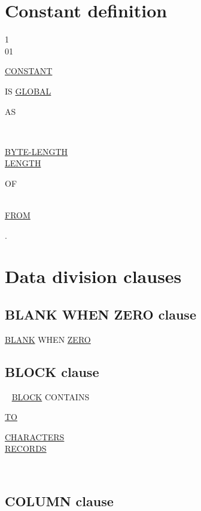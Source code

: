 \documentclass[a4paper,oneside,svgnames]{scrbook}
\makeatletter
\newcommand{\key}[1]{\underline{#1}}
\newcommand{\pending}[1]{%
  \textcolor{gray!75}{#1}}
\newenvironment{0-1}{$\left[ \begin{tabular}{@{}l@{}}}{\end{tabular} \right]$}
\newenvironment{1=}{$\left\{ \begin{tabular}{@{}l@{}}}{\end{tabular} \right\}$}
\makeatother
\begin{document}
\section{Constant definition}

\begin{1=}
  1 \\
  01
\end{1=}
 \identifier \key{CONSTANT}
\begin{0-1}
  IS \key{GLOBAL}
\end{0-1}
\begin{1=}
  AS
  \begin{1=}
    \literal \\
    \begin{1=}
      \key{BYTE-LENGTH} \\
      \key{LENGTH}
    \end{1=}
    OF \identifier
  \end{1=} \\
  \pending{\key{FROM} \identifier}
\end{1=}.

\section{Data division clauses}

\subsection{BLANK WHEN ZERO clause}
\key{BLANK} WHEN \key{ZERO}

\subsection{BLOCK clause}
\ {}\newline
\key{BLOCK} CONTAINS \integer
\begin{0-1}
  \key{TO} \integer
\end{0-1}
\begin{0-1}
  \key{CHARACTERS} \\
  \key{RECORDS}
\end{0-1}\\

\subsection{COLUMN clause}
\end{document}
